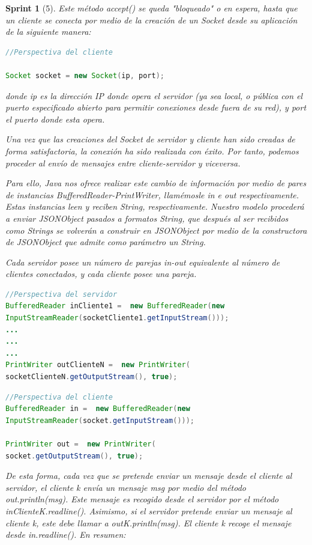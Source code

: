 \documentclass{article}
\theoremstyle{break}
\newtheorem*{sprint}{Sprint}
\begin{document}
\begin{sprint}[5]
Este método accept() se queda "bloqueado" o en espera, hasta que un cliente se conecta por medio de la creación de un Socket desde su aplicación de la siguiente manera:

\begin{lstlisting}[frame=single, language=Java]
//Perspectiva del cliente

Socket socket = new Socket(ip, port);

\end{lstlisting}

donde ip es la dirección IP donde opera el servidor (ya sea local, o pública con el puerto especificado abierto para permitir conexiones desde fuera de su red), y port el puerto donde esta opera.

Una vez que las creaciones del Socket de servidor y cliente han sido creadas de forma satisfactoria, la conexión ha sido realizada con éxito. Por tanto, podemos proceder al envío de mensajes entre cliente-servidor y viceversa.

Para ello, Java nos ofrece realizar este cambio de información por medio de pares de instancias BufferedReader-PrintWriter, llamémosle in e out respectivamente. Estas instancias leen y reciben String, respectivamente. Nuestro modelo procederá a enviar JSONObject pasados a formatos String, que después al ser recibidos como Strings se volverán a construir en JSONObject por medio de la constructora de JSONObject que admite como parámetro un String.

Cada servidor posee un número de parejas in-out equivalente al número de clientes conectados, y cada cliente posee una pareja.

\begin{lstlisting}[frame=single, language=Java]
//Perspectiva del servidor
BufferedReader inCliente1 =  new BufferedReader(new
InputStreamReader(socketCliente1.getInputStream()));
...
...
...
PrintWriter outClienteN =  new PrintWriter(
socketClienteN.getOutputStream(), true);
\end{lstlisting}

\begin{lstlisting}[frame=single, language=Java]
//Perspectiva del cliente
BufferedReader in =  new BufferedReader(new
InputStreamReader(socket.getInputStream()));

PrintWriter out =  new PrintWriter(
socket.getOutputStream(), true);
\end{lstlisting}


De esta forma, cada vez que se pretende enviar un mensaje desde el cliente al servidor, el cliente k envía un mensaje msg por medio del método out.println(msg). Este mensaje es recogido desde el servidor por el método inClienteK.readline(). Asimismo, si el servidor pretende enviar un mensaje al cliente k, este debe llamar a outK.println(msg). El cliente k recoge el mensaje desde in.readline(). En resumen:


\end{sprint}
\end{document}
